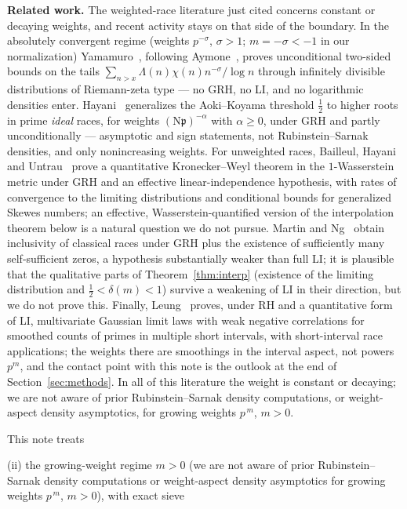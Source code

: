 \medskip\noindent\textbf{Related work.} The weighted-race literature
just cited concerns constant or decaying weights, and recent activity
stays on that side of the boundary. In the absolutely convergent regime
(weights $p^{-\sigma}$, $\sigma>1$; $m=-\sigma<-1$ in our
normalization) Yamamuro~\cite{Yam25}, following Aymone~\cite{Aym22},
proves unconditional two-sided bounds on the tails
$\sum_{n>x}\Lambda(n)\chi(n)n^{-\sigma}/\log n$ through infinitely
divisible distributions of Riemann-zeta type --- no GRH, no LI, and no
logarithmic densities enter. Hayani~\cite{Hay26} generalizes the
Aoki--Koyama threshold $\tfrac12$ to higher roots in prime
\emph{ideal} races, for weights $(\mathrm N\mathfrak p)^{-\alpha}$
with $\alpha\ge0$, under GRH and partly unconditionally --- asymptotic
and sign statements, not Rubinstein--Sarnak densities, and only
nonincreasing weights. For unweighted races, Bailleul, Hayani and
Untrau~\cite{BHU26} prove a quantitative Kronecker--Weyl theorem in
the $1$-Wasserstein metric under GRH and an effective
linear-independence hypothesis, with rates of convergence to the
limiting distributions and conditional bounds for generalized Skewes
numbers; an effective, Wasserstein-quantified version of the
interpolation theorem below is a natural question we do not pursue.
Martin and Ng~\cite{MN20} obtain inclusivity of classical races under
GRH plus the existence of sufficiently many self-sufficient zeros, a
hypothesis substantially weaker than full LI; it is plausible that the
qualitative parts of Theorem~\ref{thm:interp} (existence of the
limiting distribution and $\tfrac12<\delta(m)<1$) survive a weakening
of LI in their direction, but we do not prove this. Finally,
Leung~\cite{Leung24} proves, under RH and a quantitative form of LI,
multivariate Gaussian limit laws with weak negative correlations for
smoothed counts of primes in multiple short intervals, with
short-interval race applications; the weights there are smoothings in
the interval aspect, not powers $p^m$, and the contact point with this
note is the outlook at the end of Section~\ref{sec:methods}. In all of
this literature the weight is constant or decaying; we are not aware
of prior Rubinstein--Sarnak density computations, or weight-aspect
density asymptotics, for growing weights $p^{\,m}$, $m>0$.

This note treats


(ii) the
growing-weight regime $m>0$ (we are not aware of prior
Rubinstein--Sarnak density computations or weight-aspect density
asymptotics for growing weights $p^{\,m}$, $m>0$), with exact sieve


